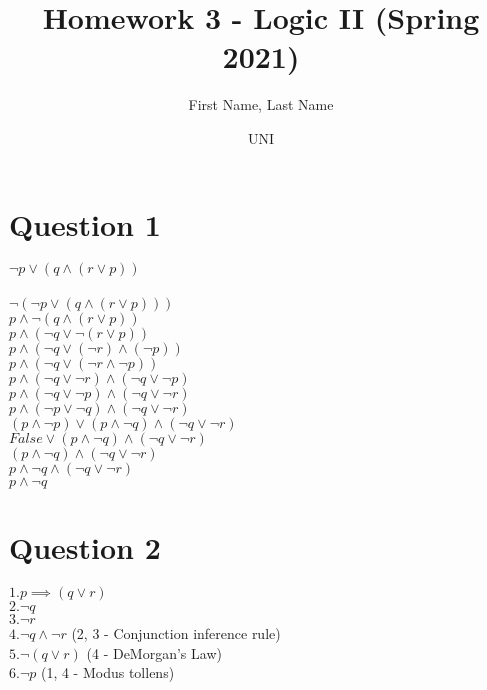 \documentclass{article}
\title{Homework 3 - Logic II (Spring 2021)}
\author
{
First Name, Last Name
\and UNI
}
\begin{document}
    \maketitle
    
    \section*{Question 1}
    $\neg p \lor (q \land (r \lor p))$\\ \\
    $\neg (\neg p \lor (q \land (r \lor p)))$ \\
    $p \land \neg(q \land (r \lor p))$ \\
    $p \land (\neg q \lor \neg(r \lor p))$ \\
    $p \land (\neg q \lor (\neg r) \land (\neg p))$ \\
    $p \land (\neg q \lor (\neg r \land \neg p))$ \\
    $p \land (\neg q \lor \neg r) \land (\neg q \lor \neg p)$ \\
    $p \land (\neg q \lor \neg p) \land (\neg q \lor \neg r) $ \\
    $p \land (\neg p \lor \neg q) \land (\neg q \lor \neg r) $ \\
    $(p \land \neg p) \lor (p \land \neg q) \land (\neg q \lor \neg r)$ \\
    $False \lor (p \land \neg q) \land (\neg q \lor \neg r)$ \\
    $(p \land \neg q) \land (\neg q \lor \neg r)$ \\
    $p \land \neg q \land (\neg q \lor \neg r)$ \\
    $p \land \neg q$ \\
    \newpage
    \section*{Question 2}
    $1. p \implies (q \lor r)$ \\
    $2. \neg q$ \\
    $3. \neg r$ \\
    $4. \neg q \land \neg r$ (2, 3 - Conjunction inference rule) \\
    $5. \neg (q \lor r)$ (4 - DeMorgan's Law) \\
    $6. \neg p $ (1, 4 - Modus tollens) \\
    
    \newpage
\end{document}
